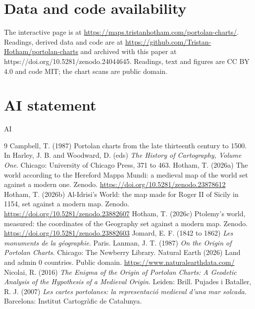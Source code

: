\documentclass[11pt,a4paper]{article}
\begin{document}
\section*{Data and code availability}
The interactive page is at \url{https://maps.tristanhotham.com/portolan-charts/}. Readings, derived data and code are at \url{https://github.com/Tristan-Hotham/portolan-charts} and archived with this paper at https://doi.org/10.5281/zenodo.24044645. Readings, text and figures are CC BY 4.0 and code MIT; the chart scans are public domain.

\section*{AI statement}
{{AI}}

\begin{thebibliography}{9}
 Campbell, T. (1987) Portolan charts from the late thirteenth century to 1500. In Harley, J. B. and Woodward, D. (eds) \textit{The History of Cartography, Volume One}. Chicago: University of Chicago Press, 371 to 463.
 Hotham, T. (2026a) The world according to the Hereford Mappa Mundi: a medieval map of the world set against a modern one. Zenodo. \url{https://doi.org/10.5281/zenodo.23878612}
 Hotham, T. (2026b) Al-Idrisi's World: the map made for Roger II of Sicily in 1154, set against a modern map. Zenodo. \url{https://doi.org/10.5281/zenodo.23882607}
 Hotham, T. (2026c) Ptolemy's world, measured: the coordinates of the Geography set against a modern map. Zenodo. \url{https://doi.org/10.5281/zenodo.23882603}
 Jomard, E. F. (1842 to 1862) \textit{Les monuments de la g\'eographie}. Paris.
 Lanman, J. T. (1987) \textit{On the Origin of Portolan Charts}. Chicago: The Newberry Library.
 Natural Earth (2026) Land and admin 0 countries. Public domain. \url{https://www.naturalearthdata.com/}
 Nicolai, R. (2016) \textit{The Enigma of the Origin of Portolan Charts: A Geodetic Analysis of the Hypothesis of a Medieval Origin}. Leiden: Brill.
 Pujades i Bataller, R. J. (2007) \textit{Les cartes portolanes: la representaci\'o medieval d'una mar solcada}. Barcelona: Institut Cartogr\`afic de Catalunya.
\end{thebibliography}
\end{document}
